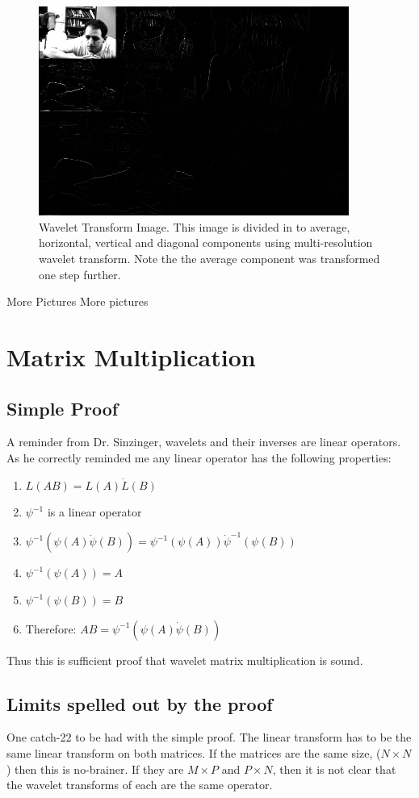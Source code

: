\documentclass[11pt]{article}
\begin{document}
\begin{figure}
\includegraphics [width=4in]{wavepic3R.jpg}
\caption{Wavelet Transform Image.  This image is divided in to average, horizontal, vertical and diagonal components using multi-resolution wavelet transform.  Note the the average component was transformed one step further. }
\label{wavepicR3}
\end{figure}

\newpage
More Pictures
\newpage
More pictures
\newpage

\section{Matrix Multiplication}
\subsection{Simple Proof}
A reminder from Dr. Sinzinger, wavelets and their inverses are linear operators.  As he correctly reminded me any linear operator has the following properties:

\begin{enumerate}
\item $L(AB) = L(A) \dot L(B)$
\item $\psi ^{-1}$ is a linear operator
\item $\psi ^{-1} (\psi (A) \dot \psi (B)) = \psi ^ {-1} (\psi (A)) \dot \psi ^{-1} (\psi(B)) $
\item $\psi ^{-1}(\psi(A)) = A$
\item $\psi ^{-1}(\psi(B)) = B$
\item Therefore:  $AB = \psi^{-1} (\psi(A) \dot \psi(B))$  
\end{enumerate}

Thus this is sufficient proof that wavelet matrix multiplication is sound.  

\subsection { Limits spelled out by the proof}
One catch-22 to be had with the simple proof.  The linear transform has to be the same linear transform on both matrices.  If the matrices are the same size, ($N\times N$) then this is no-brainer.  If they are $M \times P$ and $P\times N$, then it is not clear that the wavelet transforms of each are the same operator.  
\end{document}
